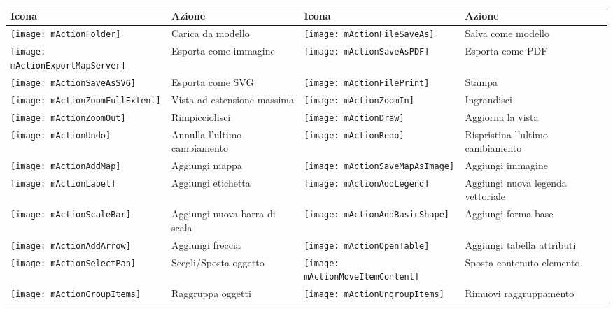 \begin{table}[h]
\centering\small
\renewcommand{\arraystretch}{2}
 \begin{tabular}{|m{1cm}|m{5.4cm}|m{1cm}|m{5.4cm}|}
 \hline \textbf{Icona} & \textbf{Azione} & \textbf{Icona} &
 \textbf{Azione} \\
 \hline \texttt{[image: mActionFolder]}
 & Carica da modello &
 \texttt{[image: mActionFileSaveAs]} & Salva come modello \\
\hline \texttt{[image: mActionExportMapServer]}
 & Esporta come immagine &
 \texttt{[image: mActionSaveAsPDF]} & Esporta come PDF \\
 \hline \texttt{[image: mActionSaveAsSVG]} & Esporta come SVG & \texttt{[image: mActionFilePrint]}
 & Stampa \\
 \hline \texttt{[image: mActionZoomFullExtent]} & Vista ad estensione massima & \texttt{[image: mActionZoomIn]} & Ingrandisci \\
 \hline \texttt{[image: mActionZoomOut]} & Rimpicciolisci &
 \texttt{[image: mActionDraw]} & Aggiorna la vista \\
 \hline \texttt{[image: mActionUndo]} & Annulla l'ultimo cambiamento & \texttt{[image: mActionRedo]}
 & Rispristina l'ultimo cambiamento \\
 \hline \texttt{[image: mActionAddMap]} & Aggiungi mappa & \texttt{[image: mActionSaveMapAsImage]}
 & Aggiungi immagine \\
  \hline \texttt{[image: mActionLabel]} & Aggiungi etichetta & \texttt{[image: mActionAddLegend]} & 
 Aggiungi nuova legenda vettoriale \\
 \hline \texttt{[image: mActionScaleBar]} & Aggiungi nuova barra di scala
 & \texttt{[image: mActionAddBasicShape]}
 & Aggiungi forma base \\
 \hline \texttt{[image: mActionAddArrow]} & Aggiungi freccia
 & \texttt{[image: mActionOpenTable]} & Aggiungi tabella attributi \\
 \hline \texttt{[image: mActionSelectPan]} & Scegli/Sposta oggetto &
 \texttt{[image: mActionMoveItemContent]} & Sposta contenuto elemento \\
 \hline \texttt{[image: mActionGroupItems]} & Raggruppa oggetti &
 \texttt{[image: mActionUngroupItems]} & Rimuovi raggruppamento \\

\end{tabular}
\end{table}
